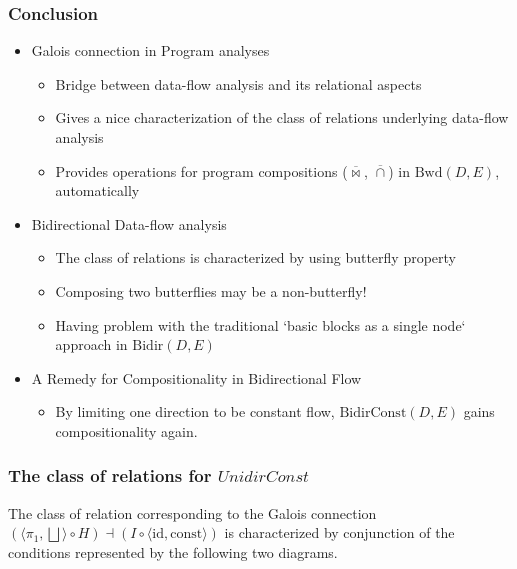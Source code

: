 \documentclass{beamer}
\newcommand{\Bidir}{\mathrm{Bidir}}
\newcommand{\Unidir}{\mathrm{Bwd}}
\newcommand{\UnidirConst}{\mathrm{BidirConst}}
\newcommand{\bigjoin}{\bigsqcup}
\newcommand{\comp}{\circ}
\newcommand{\bowtielift}{\mathbin{\overline{\bowtie}}}
\newcommand{\caplift}{\mathbin{\overline{\cap}}}
\newcommand{\rotleq}{\rotatebox[origin=c]{90}{$\leq$}}
\begin{document}
\begin{frame}
  \frametitle{Conclusion}
  \begin{itemize}
    \item Galois connection in Program analyses
    \begin{itemize}
      \item Bridge between data-flow analysis and its relational aspects
      \item Gives a nice characterization of the class of relations underlying data-flow analysis
      \item Provides operations for program compositions ($\bowtielift$, $\caplift$) in $\Unidir(D, E)$, automatically
    \end{itemize}
    \item Bidirectional Data-flow analysis
    \begin{itemize}
      \item The class of relations is characterized by using butterfly property
      \item Composing two butterflies may be a non-butterfly!
      \item Having problem with the traditional `basic blocks as a single node` approach in $\Bidir(D, E)$
    \end{itemize}
    \item A Remedy for Compositionality in Bidirectional Flow
    \begin{itemize}
      \item By limiting one direction to be constant flow, $\UnidirConst(D, E)$ gains compositionality again.
    \end{itemize}
  \end{itemize}
\end{frame}

\begin{frame} [fragile]
  \frametitle{The class of relations for $UnidirConst$}
  The class of relation corresponding to the Galois connection $(\langle {\pi_{1}, \bigjoin } \rangle \comp H)  \dashv (I \comp \langle {\mathrm{id}, \mathrm{const}}\rangle)$
  is characterized by conjunction of the conditions represented by the following two diagrams.
  \begin{center}
  \end{center}
\end{frame}
\end{document}
